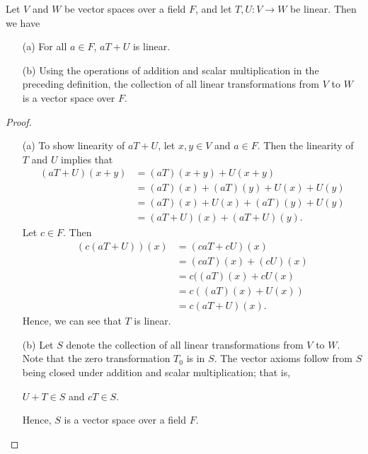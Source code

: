 \begin{theorem}
   Let \( V  \) and \( W  \) be vector spaces over a field \( F  \), and let \( T,U: V \to W  \) be linear. Then we have
   \begin{enumerate}
       \item[(a)] For all \( a \in F  \), \( aT + U  \) is linear.
       \item[(b)] Using the operations of addition and scalar multiplication in the preceding definition, the collection of all linear transformations from \( V  \) to \( W  \) is a vector space over \( F  \).
   \end{enumerate}
\end{theorem}
\begin{proof}
    \begin{enumerate}
        \item[(a)] To show linearity of \( aT + U  \),  let \( x,y \in V  \) and \( a \in F  \). Then the linearity of \( T  \) and \( U  \) implies that 
    \begin{align*}
        (aT + U)(x+y) &= (aT)(x+y) + U(x+y)  \\
                      &= (aT)(x) + (aT)(y)  + U(x) + U(y) \\
                      &= (aT)(x) + U(x) + (aT)(y) + U(y) \\
                      &= (aT+U)(x) + (aT +  U)(y). 
    \end{align*}
    Let \( c \in F  \). Then 
    \begin{align*}
        (c(aT+U))(x) &= (caT + cU)(x) \\
                     &= (caT)(x) + (cU)(x) \\
                     &= c((aT)(x) + cU(x) \\
                     &= c ((aT)(x) + U(x)) \\
                     &= c (aT + U)(x).
    \end{align*}
    Hence, we can see that \( T  \) is linear.
\item[(b)] Let \( S  \) denote the collection of all linear transformations from \( V  \) to \( W  \). Note that the zero transformation \( {T}_{0} \) is in \( S  \). The vector axioms follow from \( S  \) being closed under addition and scalar multiplication; that is, 
    \begin{center}
       \( U + T \in S  \) and \( cT \in S  \). 
    \end{center}
    Hence, \( S  \) is a vector space over a field \( F  \).
    \end{enumerate}
\end{proof}

